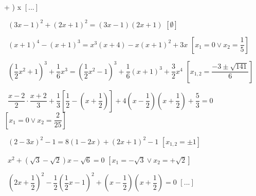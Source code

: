 \begin{esercizio}[\Ast]
\begin{enumeratea}
+ \right) x\)
  \hfill\(\left[...\right]\)
 \item~\((3 x-1)^{2} + (2 x + 1)^{2} = (3 x-1) (2 x + 1)\)
  \hfill\(\left[\emptyset\right]\)
 \item~\((x + 1)^{4}-(x + 1)^{3} = x^{3} (x + 4)-x (x + 1)^{2} + 3 x\)
  \hfill\(\left[x_{1} = 0 \vee x_{2} = \dfrac{1}{5}\right]\)
 \item~\(\left(\dfrac{1}{2} x^{2} + 1 \right)^{3} + \dfrac{1}{6} x^{3} = 
\left(\dfrac{1}{2} x^{2}-1 \right)^{3} + \dfrac{1}{6} (x + 1)^{3} + 
\dfrac{3}{2} x^{4}\)
  \hfill\(\left[x_{1,2} = \dfrac{- 3 \pm \sqrt{141}}{6}\right]\)
 \item~\(\dfrac{x-2}{2} \cdot \dfrac{x + 2}{3} + \dfrac{1}{3} 
\left[\dfrac{1}{2}-\left(x + \dfrac{1}{2} \right) \right] + 4 \left(x 
-\dfrac{1}{2} 
\right) \left(x + \dfrac{1}{2} \right) + \dfrac{5}{3} = 0\)
  \hfill\(\left[x_{1} = 0 \vee x_{2} = \dfrac{2}{25}\right]\)
 \item~\((2-3 x)^{2}-1 = 8 (1-2 x) + (2 x + 1)^{2}-1\)
  \hfill\(\left[x_{1,2} =\pm 1\right]\)
 \item~\(x^{2} + \left(\sqrt{3}-\sqrt{2} \right) x-\sqrt{6} = 0\)
  \hfill\(\left[x_{1} =-\sqrt{3} \vee x_{2} = + \sqrt{2}\right]\)
 \item~\(\left(2 x + \dfrac{1}{2} \right)^{2}-\dfrac{1}{2} 
        \left(\dfrac{1}{2} x-1 \right)^{2} + \left(x-\dfrac{1}{2} \right) 
        \left(x + \dfrac{1}{2} \right) = 0\)
  \hfill\(\left[...\right]\)
 \end{enumeratea}
\end{esercizio}

